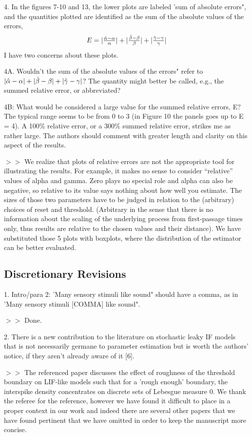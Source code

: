 \documentclass{article}
\begin{document}
\vskip 10pt
4. In the figures 7-10 and 13, the lower plots are labeled 'sum of absolute
errors", and the quantities plotted are identified as the sum of the absolute
values of the errors, $$E =
|\tfrac{{ \hat{{\alpha}} } - \alpha}{\alpha}|+ |\tfrac{{ \hat{{\beta}} } - \beta}{\beta}|+ |\tfrac{{ \hat{{\gamma }} }  -
\gamma}{\gamma}|$$
I have two concerns about these plots.

4A. Wouldn't the sum of the absolute values of the errors" refer to
$| { \hat{{\alpha}} } - \alpha|+ | {{ \hat{{\beta}} } - \beta} |+ | {{ \hat{{\gamma }} }  -
\gamma}|$? The
quantity might better be called, e.g., the summed relative error, or abbreviated?

4B: What would be considered a large value for the summed relative errors, E?
The typical range seems to be from 0 to 3 (in Figure 10 the panels goes up to E
= 4). A 100\% relative error, or a 300\% summed relative error, strikes me as rather large.
The authors should comment with greater length and clarity on this aspect of the results.

$>>$ We realize that plots of relative errors are not the appropriate
tool for illustrating the results. For example, it makes no sense to
consider ``relative'' values of alpha and gamma. Zero plays no special
role and alpha can also be negative, so relative to its value says
nothing about how well you estimate. The sizes of those two parameters
have to be judged in relation to the (arbitrary) choices of reset and
threshold. (Arbitrary in the sense that there is no information about
the scaling of the underlying process from first-passage times only,
thus results are relative to the chosen values and their distance). We
have substituted those 5 plots
with boxplots, where the distribution of the estimator can be better
evaluated.

\subsection{Discretionary Revisions}
1. Intro/para 2: 'Many sensory stimuli like sound" should have a comma, as in
'Many sensory stimuli [COMMA] like sound".

$>>$ Done.

\vskip 10pt 2. There is a new contribution to the literature on stochastic leaky IF models
that is not necessarily germane to parameter estimation but is worth the
authors' notice, if they aren't already aware of it  [6].

$>>$ The referenced paper discusses the effect of roughness of the threshold
boundary on LIF-like models such that for a 'rough enough' boundary, the
interspike density concentrates on discrete sets of Lebesgue measure 0. We thank
the referee for the reference, however we have found it difficult to place in a
proper context in our work and indeed there are several other papers that we
have found pertinent that we have omitted in order to keep the manuscript more concise.
\end{document}
